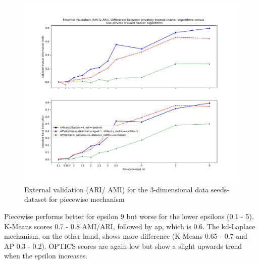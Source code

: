 \begin{figure}[H]
\begin{minipage}[c]{0.60\textwidth}
        \includegraphics[width=1\textwidth]{Results/3d-piecewise/seeds-dataset/ami-and-ari.png}
        \caption{External validation (ARI/ AMI) for the 3-dimensional data seeds-dataset for piecewise mechanism}
        \label{fig:external-validation-seeds-dataset_comparison_3d-piecewise}
    \end{minipage}
\end{figure}
Piecewise performs better for epsilon 9 but worse for the lower epsilons (0.1 - 5).
K-Means scores 0.7 - 0.8 AMI/ARI, followed by \gls{ap}, which is 0.6.
The kd-Laplace mechanism, on the other hand, shows more difference (K-Means 0.65 - 0.7 and AP 0.3 - 0.2).
OPTICS scores are again low but show a slight upwards trend when the epsilon increases.

